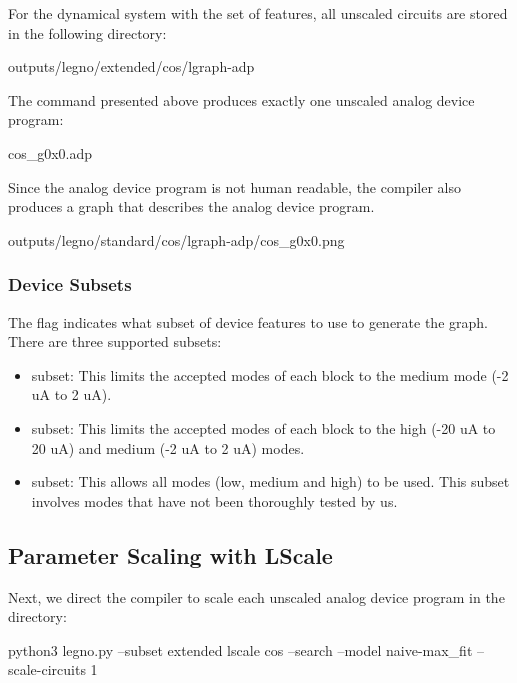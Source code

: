 For the  dynamical system with the  set of features, all
unscaled circuits are stored in the following directory:

\begin{snippet}
  outputs/legno/extended/cos/lgraph-adp
\end{snippet}

The \lgraph command presented above produces exactly one unscaled analog device program: 

\begin{snippet}
  cos_g0x0.adp
\end{snippet}

Since the analog device program is not human readable, the compiler also
produces a graph that describes the analog device program.

\begin{snippet}
  outputs/legno/standard/cos/lgraph-adp/cos_g0x0.png
\end{snippet}

\subsubsection{Device Subsets}

The  flag indicates what subset of device features to use to generate
the graph. There are three supported subsets:

\begin{itemize}
\item{} subset: This limits the accepted modes of each block to the
  medium mode (-2 uA to 2 uA). 
\item{} subset: This limits the accepted modes of each block to the
  high (-20 uA to 20 uA) and medium (-2 uA to 2 uA) modes.
\item{} subset: This allows all modes (low, medium and high) to
  be used. This subset involves modes that have not been thoroughly tested by us.
\end{itemize}

\subsection{Parameter Scaling with LScale}

Next, we direct the \legno compiler to scale each unscaled analog device program
in the  directory:

\begin{snippet}
  python3 legno.py --subset extended lscale cos --search
     --model naive-max_fit --scale-circuits 1
\end{snippet}

